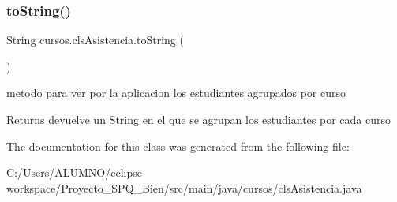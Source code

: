 \subsubsection{\texorpdfstring{to\+String()}{toString()}}
{\footnotesize\ttfamily String cursos.\+cls\+Asistencia.\+to\+String (\begin{DoxyParamCaption}{ }\end{DoxyParamCaption})}

metodo para ver por la aplicacion los estudiantes agrupados por curso

\begin{DoxyReturn}{Returns}
devuelve un String en el que se agrupan los estudiantes por cada curso 
\end{DoxyReturn}


The documentation for this class was generated from the following file\+:\begin{DoxyCompactItemize}
\item 
C\+:/\+Users/\+A\+L\+U\+M\+N\+O/eclipse-\/workspace/\+Proyecto\+\_\+\+S\+P\+Q\+\_\+Bien/src/main/java/cursos/cls\+Asistencia.\+java\end{DoxyCompactItemize}

